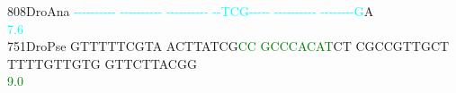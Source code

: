 \documentclass[11pt,twoside,reqno,a4paper]{article}
\begin{document}
{808\hspace*{2\charwidth}DroAna	\textcolor{cyan}{-}\textcolor{cyan}{-}\textcolor{cyan}{-}\textcolor{cyan}{-}\textcolor{cyan}{-}\textcolor{cyan}{-}\textcolor{cyan}{-}\textcolor{cyan}{-}\textcolor{cyan}{-}\textcolor{cyan}{-}	\textcolor{cyan}{-}\textcolor{cyan}{-}\textcolor{cyan}{-}\textcolor{cyan}{-}\textcolor{cyan}{-}\textcolor{cyan}{-}\textcolor{cyan}{-}\textcolor{cyan}{-}\textcolor{cyan}{-}\textcolor{cyan}{-}	\textcolor{cyan}{-}\textcolor{cyan}{-}\textcolor{cyan}{-}\textcolor{cyan}{-}\textcolor{cyan}{-}\textcolor{cyan}{-}\textcolor{cyan}{-}\textcolor{cyan}{-}\textcolor{cyan}{-}\textcolor{cyan}{-}	\textcolor{cyan}{-}\textcolor{cyan}{-}\textcolor{cyan}{T}\textcolor{cyan}{C}\textcolor{cyan}{G}\textcolor{cyan}{-}\textcolor{cyan}{-}\textcolor{cyan}{-}\textcolor{cyan}{-}\textcolor{cyan}{-}	\textcolor{cyan}{-}\textcolor{cyan}{-}\textcolor{cyan}{-}\textcolor{cyan}{-}\textcolor{cyan}{-}\textcolor{cyan}{-}\textcolor{cyan}{-}\textcolor{cyan}{-}\textcolor{cyan}{-}\textcolor{cyan}{-}	\textcolor{cyan}{-}\textcolor{cyan}{-}\textcolor{cyan}{-}\textcolor{cyan}{-}\textcolor{cyan}{-}\textcolor{cyan}{-}\textcolor{cyan}{-}\textcolor{cyan}{-}\textcolor{cyan}{G}A	\\
\hspace*{5\charwidth}\hspace*{7\charwidth}\hspace*{0\charwidth}\textcolor{cyan}{7.6}\hspace*{1\charwidth}\hspace*{1\charwidth}\hspace*{1\charwidth}\hspace*{1\charwidth}\hspace*{1\charwidth}\hspace*{1\charwidth}\\
751\hspace*{2\charwidth}DroPse	GTTTTTCGTA	ACTTATCG\textcolor{green}{C}\textcolor{green}{C}	\textcolor{green}{G}\textcolor{green}{C}\textcolor{green}{C}\textcolor{green}{C}\textcolor{green}{A}\textcolor{green}{C}\textcolor{green}{A}\textcolor{green}{T}CT	CGCCGTTGCT	TTTTGTTGTG	GTTCTTACGG	\\
\hspace*{5\charwidth}\hspace*{7\charwidth}\hspace*{1\charwidth}\hspace*{18\charwidth}\textcolor{green}{9.0}\hspace*{1\charwidth}\hspace*{1\charwidth}\hspace*{1\charwidth}\hspace*{1\charwidth}\hspace*{1\charwidth}\\
}
\end{document}
